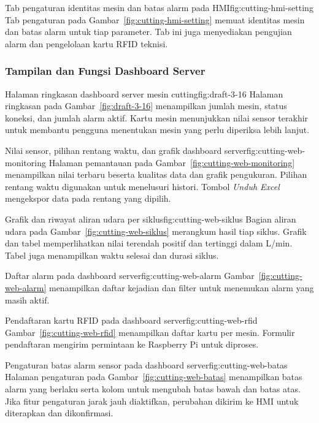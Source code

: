   {Tab pengaturan identitas mesin dan batas alarm pada HMI}{fig:cutting-hmi-setting}
  {Tab pengaturan pada Gambar~\ref{fig:cutting-hmi-setting} memuat identitas mesin dan batas alarm untuk tiap parameter. Tab ini juga menyediakan pengujian alarm dan pengelolaan kartu RFID teknisi.}

\Needspace{8.5cm}
\subsubsection{Tampilan dan Fungsi Dashboard Server}

  {Halaman ringkasan dashboard server mesin cutting}{fig:draft-3-16}
  {Halaman ringkasan pada Gambar~\ref{fig:draft-3-16} menampilkan jumlah mesin, status koneksi, dan jumlah alarm aktif. Kartu mesin menunjukkan nilai sensor terakhir untuk membantu pengguna menentukan mesin yang perlu diperiksa lebih lanjut.}

  {Nilai sensor, pilihan rentang waktu, dan grafik dashboard server}{fig:cutting-web-monitoring}
  {Halaman pemantauan pada Gambar~\ref{fig:cutting-web-monitoring} menampilkan nilai terbaru beserta kualitas data dan grafik pengukuran. Pilihan rentang waktu digunakan untuk menelusuri histori. Tombol \textit{Unduh Excel} mengekspor data pada rentang yang dipilih.}

  {Grafik dan riwayat aliran udara per siklus}{fig:cutting-web-siklus}
  {Bagian aliran udara pada Gambar~\ref{fig:cutting-web-siklus} merangkum hasil tiap siklus. Grafik dan tabel memperlihatkan nilai terendah positif dan tertinggi dalam L/min. Tabel juga menampilkan waktu selesai dan durasi siklus.}

  {Daftar alarm pada dashboard server}{fig:cutting-web-alarm}
  {Gambar~\ref{fig:cutting-web-alarm} menampilkan daftar kejadian dan filter untuk menemukan alarm yang masih aktif.}

  {Pendaftaran kartu RFID pada dashboard server}{fig:cutting-web-rfid}
  {Gambar~\ref{fig:cutting-web-rfid} menampilkan daftar kartu per mesin. Formulir pendaftaran mengirim permintaan ke Raspberry Pi untuk diproses.}

  {Pengaturan batas alarm sensor pada dashboard server}{fig:cutting-web-batas}
  {Halaman pengaturan pada Gambar~\ref{fig:cutting-web-batas} menampilkan batas alarm yang berlaku serta kolom untuk mengubah batas bawah dan batas atas. Jika fitur pengaturan jarak jauh diaktifkan, perubahan dikirim ke HMI untuk diterapkan dan dikonfirmasi.}


